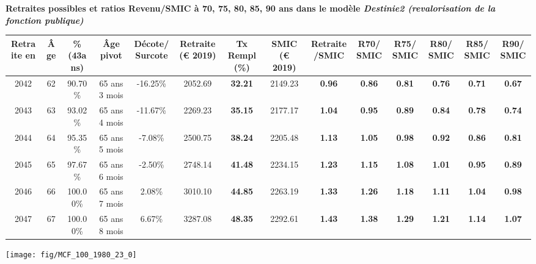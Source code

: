  \vspace{0.1cm} 
{\bf \noindent Retraites possibles et ratios Revenu/SMIC à 70, 75, 80, 85, 90 ans dans le modèle \emph{Destinie2 (revalorisation de la fonction publique)}}  
 
\begin{adjustbox}{max width=\textwidth} 
\begin{tabular}[htb]{|c|c||c|c|c||c|c||c|c||c|c|c|c|c|} 
\hline 
 Retraite en &  Âge &  \%(43ans) &  Âge pivot &  Décote/Surcote &  Retraite (\euro{} 2019) &  Tx Rempl(\%) &  SMIC (\euro{} 2019) &  Retraite/SMIC &  R70/SMIC &  R75/SMIC &  R80/SMIC &  R85/SMIC &  R90/SMIC \\ 
\hline \hline 
 2042 &  62 &  90.70\% &  65 ans 3 mois &  -16.25\% &  2052.69 &  {\bf 32.21} &  2149.23 &  {\bf {\color{red} 0.96}} &  {\bf {\color{red} 0.86}} &  {\bf {\color{red} 0.81}} &  {\bf {\color{red} 0.76}} &  {\bf {\color{red} 0.71}} &  {\bf {\color{red} 0.67}} \\ 
\hline 
 2043 &  63 &  93.02\% &  65 ans 4 mois &  -11.67\% &  2269.23 &  {\bf 35.15} &  2177.17 &  {\bf 1.04} &  {\bf {\color{red} 0.95}} &  {\bf {\color{red} 0.89}} &  {\bf {\color{red} 0.84}} &  {\bf {\color{red} 0.78}} &  {\bf {\color{red} 0.74}} \\ 
\hline 
 2044 &  64 &  95.35\% &  65 ans 5 mois &  -7.08\% &  2500.75 &  {\bf 38.24} &  2205.48 &  {\bf 1.13} &  {\bf 1.05} &  {\bf {\color{red} 0.98}} &  {\bf {\color{red} 0.92}} &  {\bf {\color{red} 0.86}} &  {\bf {\color{red} 0.81}} \\ 
\hline 
 2045 &  65 &  97.67\% &  65 ans 6 mois &  -2.50\% &  2748.14 &  {\bf 41.48} &  2234.15 &  {\bf 1.23} &  {\bf 1.15} &  {\bf 1.08} &  {\bf 1.01} &  {\bf {\color{red} 0.95}} &  {\bf {\color{red} 0.89}} \\ 
\hline 
 2046 &  66 &  100.00\% &  65 ans 7 mois &  2.08\% &  3010.10 &  {\bf 44.85} &  2263.19 &  {\bf 1.33} &  {\bf 1.26} &  {\bf 1.18} &  {\bf 1.11} &  {\bf 1.04} &  {\bf {\color{red} 0.98}} \\ 
\hline 
 2047 &  67 &  100.00\% &  65 ans 8 mois &  6.67\% &  3287.08 &  {\bf 48.35} &  2292.61 &  {\bf 1.43} &  {\bf 1.38} &  {\bf 1.29} &  {\bf 1.21} &  {\bf 1.14} &  {\bf 1.07} \\ 
\hline 
\hline 
\end{tabular} 
\end{adjustbox} 
 
 \vspace{0.1cm} 

 {\hspace{-2.2cm}\texttt{[image: fig/MCF\_100\_1980\_23\_0]}} 

